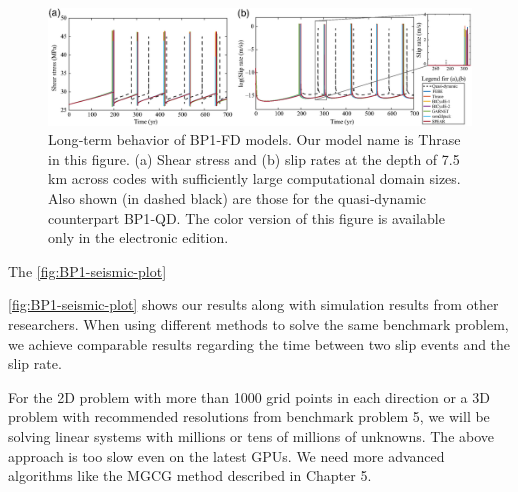 \begin{figure}
    \centering
    \includegraphics[width=\linewidth]{figures/BP1-seismic-plot.png}
    \caption{Long‐term behavior of BP1‐FD models. Our model name is Thrase in this figure. (a) Shear stress and (b) slip rates at the depth of 7.5 km across codes with sufficiently large computational domain sizes. Also shown (in dashed black) are those for the quasi‐dynamic counterpart BP1‐QD. The color version of this figure is available only in the electronic edition. \cite{erickson2023incorporating}}
    \label{fig:BP1-seismic-plot}
\end{figure}

The \autoref{fig:BP1-seismic-plot}

\autoref{fig:BP1-seismic-plot} shows our results along with simulation results from other researchers. 
When using different methods to solve the same benchmark problem, we achieve comparable results regarding the time between two slip events and the slip rate.


For the 2D problem with more than 1000 grid points in each direction or a 3D problem with recommended resolutions from benchmark problem 5, we will be solving linear systems with millions or tens of millions of unknowns.
The above approach is too slow even on the latest GPUs.
We need more advanced algorithms like the MGCG method described in Chapter 5.
